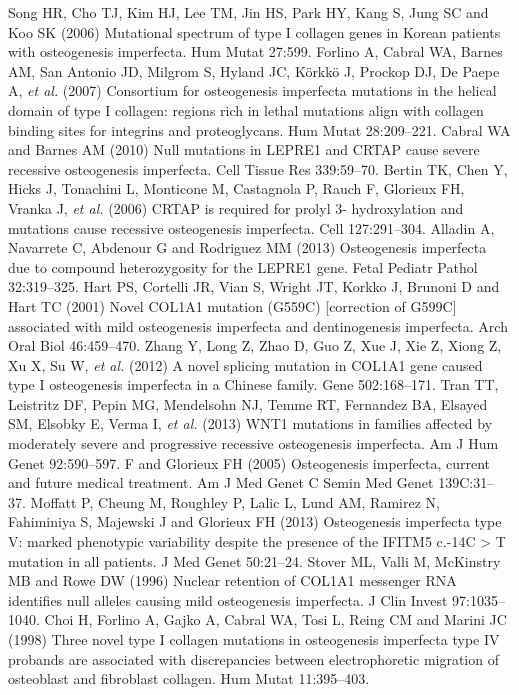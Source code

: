 \begin{biblio}[References]
 Song HR, Cho TJ, Kim HJ, Lee TM, Jin HS, Park HY, Kang S, Jung SC and Koo SK (2006) Mutational spectrum of type I collagen genes in Korean patients with osteogenesis imperfecta. Hum Mutat 27:599.
 Forlino A, Cabral WA, Barnes AM, San Antonio JD, Milgrom S, Hyland JC, Körkkö J, Prockop DJ, De Paepe A, \textit{et al.} (2007) Consortium for osteogenesis imperfecta mutations in the helical domain of type I collagen: regions rich in lethal mutations align with collagen binding sites for integrins and proteoglycans. Hum Mutat 28:209–221.
 Cabral WA and Barnes AM (2010) Null mutations in LEPRE1 and CRTAP cause severe recessive osteogenesis imperfecta. Cell Tissue Res 339:59–70.
 Bertin TK, Chen Y, Hicks J, Tonachini L, Monticone M, Castagnola P, Rauch F, Glorieux FH, Vranka J, \textit{et al.} (2006) CRTAP is required for prolyl 3- hydroxylation and mutations cause recessive osteogenesis imperfecta. Cell 127:291–304.
 Alladin A, Navarrete C, Abdenour G and Rodriguez MM (2013) Osteogenesis imperfecta due to compound heterozygosity for the LEPRE1 gene. Fetal Pediatr Pathol 32:319–325.
 Hart PS, Cortelli JR, Vian S, Wright JT, Korkko J, Brunoni D and Hart TC (2001) Novel COL1A1 mutation (G559C) [correction of G599C] associated with mild osteogenesis imperfecta and dentinogenesis imperfecta. Arch Oral Biol 46:459–470.
 Zhang Y, Long Z, Zhao D, Guo Z, Xue J, Xie Z, Xiong Z, Xu X, Su W, \textit{et al.} (2012) A novel splicing mutation in COL1A1 gene caused type I osteogenesis imperfecta in a Chinese family. Gene 502:168–171.
 Tran TT, Leistritz DF, Pepin MG, Mendelsohn NJ, Temme RT, Fernandez BA, Elsayed SM, Elsobky E, Verma I, \textit{et al.} (2013) WNT1 mutations in families affected by moderately severe and progressive recessive osteogenesis imperfecta. Am J Hum Genet 92:590–597.
F and Glorieux FH (2005) Osteogenesis imperfecta, current and future medical treatment. Am J Med Genet C Semin Med Genet 139C:31–37.
 Moffatt P, Cheung M, Roughley P, Lalic L, Lund AM, Ramirez N, Fahiminiya S, Majewski J and Glorieux FH (2013) Osteogenesis imperfecta type V: marked phenotypic variability despite the presence of the IFITM5 c.-14C > T mutation in all patients. J Med Genet 50:21–24.
 Stover ML, Valli M, McKinstry MB and Rowe DW (1996) Nuclear retention of COL1A1 messenger RNA identifies null alleles causing mild osteogenesis imperfecta. J Clin Invest 97:1035–1040.
 Choi H, Forlino A, Gajko A, Cabral WA, Tosi L, Reing CM and Marini JC (1998) Three novel type I collagen mutations in osteogenesis imperfecta type IV probands are associated with discrepancies between electrophoretic migration of osteoblast and fibroblast collagen. Hum Mutat 11:395–403.

\end{biblio}
